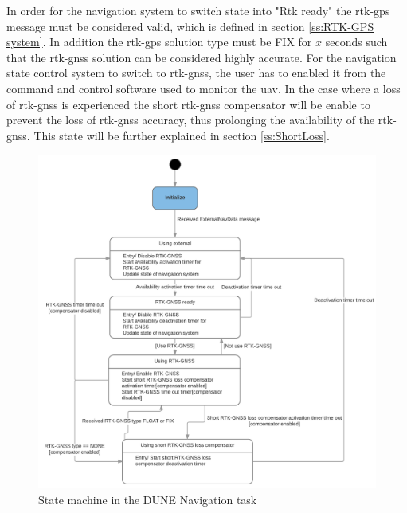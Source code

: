 In order for the navigation system to switch state into "Rtk ready" the \gls{rtk-gps} message must be considered valid, which is defined in section \ref{ss:RTK-GPS system}. In addition the \gls{rtk-gps} solution type must be FIX for $x$ seconds such that the \gls{rtk-gnss} solution can be considered highly accurate. For the navigation state control system to switch to \gls{rtk-gnss}, the user has to enabled it from the command and control software used to monitor the \gls{uav}. In the case where a loss of \gls{rtk-gnss} is experienced the short \gls{rtk-gnss} compensator will be enable to prevent the loss of \gls{rtk-gnss} accuracy, thus prolonging the availability of the \gls{rtk-gnss}. This state will be further explained in section \ref{ss:ShortLoss}.
\newpage
\begin{figure}[H]
\includegraphics[scale=0.18]{figs/NavigationStateControl.png}
\caption{State machine in the DUNE Navigation task}
\label{Fig:NavState}
\end{figure}

